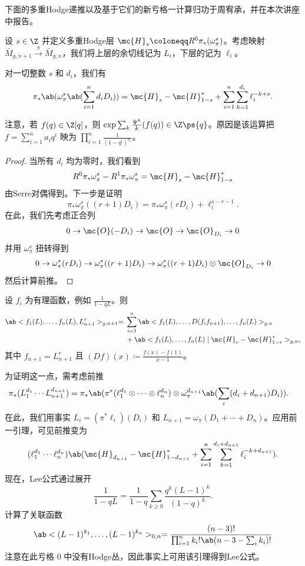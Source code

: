 下面的多重Hodge递推以及基于它们的新亏格一计算归功于周宥承，并在本次讲座中报告。

设 \(s \in \Z\) 并定义多重Hodge层 \(\mc{H}_s \coloneqq R^0 \pi_* (\omega_{\pi}^s)\)。考虑映射 \(\bar{M}_{g,n+1} \xrightarrow{\pi} \bar{M}_{g,n}\)，我们将上层的余切线记为 \(L_i\)，下层的记为 \(\ell_i\)。

\begin{lem}
    对一切整数 \(s\) 和 \(d_i\)，我们有
    \[ \pi_*\ab(\omega_{\pi}^s\ab(\sum_{i=1}^n d_i D_i)) = \mc{H}_s-\mc{H}_{1-s}^* + \sum_{i=1}^n \sum_{k=1}^{d_i} \ell_i^{-k+s}. \]
\end{lem}

\begin{rmk}
    注意，若 \(f(q) \in \Z[q]\)，则 \(\exp \sum_k \frac{\Psi^k}{k} (f(q)) \in \Z \ps{q}\)。原因是该运算把 \(f = \sum_{i=1}^{n} a_i q^i\) 映为 \(\prod_{i=1}^n \frac{1}{(1-q^i)^{a_i}}\)。
\end{rmk}

\begin{proof}
    当所有 \(d_i\) 均为零时，我们看到
    \[ R^0 \pi_* \omega_{\pi}^s - R^1 \pi_* \omega_{\pi}^s = \mc{H}_s - \mc{H}_{1-s}^* \]
    由Serre对偶得到。下一步是证明
    \[ \pi_* \omega_{\pi}^s ((r+1)D_i) = \pi_* \omega_{\pi}^s(r D_i) + \ell_i^{s-r-1}. \]
    在此，我们先考虑正合列
    \[ 0 \to \mc{O} (-D_i) \to \mc{O} \to \mc{O}_{D_i} \to 0 \]
    并用 \(\omega_{\pi}^s\) 扭转得到
    \[ 0 \to \omega_{\pi}^s(r D_i) \to \omega_{\pi}^s ((r+1)D_i) \to \omega_{\pi}^s ((r+1)D_i) \otimes \mc{O}_{D_i} \to 0 \]
    然后计算前推。
\end{proof}

\begin{lem}
    设 \(f_i\) 为有理函数，例如 \(\frac{1}{1-q L}\)。则
    \begin{align*}
        \ab<f_1(L), \ldots, f_n(L), L_{n+1}^r>_{g, n+1} ={}& \sum_{i=1}^n \ab<f_1(L), \ldots, D(f_i f_{n+1}), \ldots, f_n(L)>_{g, n} \\
        &+ \ab<f_1(L), \ldots, f_n(L) \mid \mc{H}_r - \mc{H}_{1-r}^*>_{g,n},
    \end{align*}
    其中 \(f_{n+1} = L_{n+1}^r\) 且 \((Df)(x) \coloneqq \frac{f(x)-f(1)}{x-1}\)。
\end{lem}

为证明这一点，需考虑前推
\begin{align*}
    \pi_* (L_1^{d_1} \cdots L_{n+1}^{d_{n+1}}) &= \pi_* \ab(\pi^*(\ell_1^{d_1} \otimes \cdots \otimes \ell_n^{d_n}) \otimes \omega_{\pi}^{d_{n+1}}\ab(\sum_i (d_i+d_{n+1})D_i)).
\end{align*}
在此，我们用事实 \(L_i = (\pi^* \ell_i)(D_i)\) 和 \(L_{n+1} = \omega_{\pi}(D_1 + \cdots + D_n)\)。应用前一引理，可见前推变为
\[ (\ell_1^{d_1} \cdots \ell_n^{d_n})\ab(\mc{H}_{d_{n+1}} - \mc{H}_{1-d_{n+1}}^* + \sum_{i=1}^n \sum_{k=1}^{d_i + d_{n+1}} \ell_i^{-k+d_{n+1}}). \]
现在，Lee公式通过展开
\[ \frac{1}{1-qL} = \frac{1}{1-q} \sum_{k \geq 0} \frac{q^k(L-1)^k}{(1-q)^k}. \]
计算了关联函数
\[ \ab<(L-1)^{k_1}, \ldots, (L-1)^{k_n}>_{0,n} = \frac{(n-3)!}{\prod_{i=1}^n k_i! \ab(n-3-\sum_i k_i)!} \]
注意在此亏格 \(0\) 中没有Hodge丛，因此事实上可用该引理得到Lee公式。

